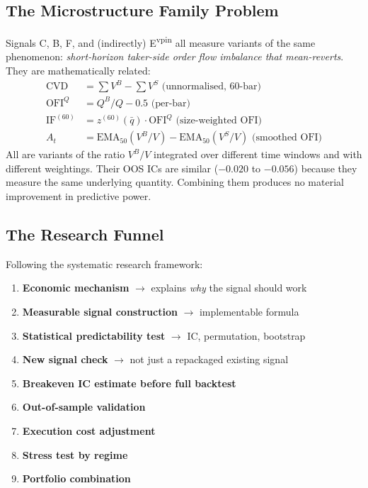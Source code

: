 \documentclass[12pt, a4paper]{article}
\theoremstyle{definition}
\newcommand{\EMA}{\mathrm{EMA}}
\begin{document}
\subsection{The Microstructure Family Problem}

Signals C, B, F, and (indirectly) E\textsuperscript{vpin} all measure variants of the same
phenomenon: \emph{short-horizon taker-side order flow imbalance that
mean-reverts}. They are mathematically related:
\begin{align*}
  \text{CVD}        &= \sum V^B - \sum V^S \text{ (unnormalised, 60-bar)}\\
  \text{OFI}^Q      &= Q^B/Q - 0.5 \text{ (per-bar)} \\
  \text{IF}^{(60)}  &= z^{(60)}(\bar{q}) \cdot \text{OFI}^Q \text{ (size-weighted OFI)}\\
  A_t               &= \EMA_{50}(V^B/V) - \EMA_{50}(V^S/V) \text{ (smoothed OFI)}
\end{align*}
All are variants of the ratio $V^B/V$ integrated over different time windows
and with different weightings. Their OOS ICs are similar ($-0.020$ to $-0.056$)
because they measure the same underlying quantity. Combining them produces
no material improvement in predictive power.

\subsection{The Research Funnel}

Following the systematic research framework:
\begin{enumerate}
  \item \textbf{Economic mechanism} $\to$ explains \emph{why} the signal should work
  \item \textbf{Measurable signal construction} $\to$ implementable formula
  \item \textbf{Statistical predictability test} $\to$ IC, permutation, bootstrap
  \item \textbf{New signal check} $\to$ not just a repackaged existing signal
  \item \textbf{Breakeven IC estimate before full backtest}
  \item \textbf{Out-of-sample validation}
  \item \textbf{Execution cost adjustment}
  \item \textbf{Stress test by regime}
  \item \textbf{Portfolio combination}
\end{enumerate}
\end{document}
